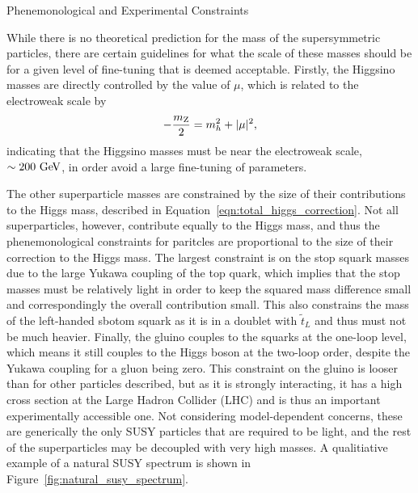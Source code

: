 \begin{section}{Phenemonological and Experimental Constraints}
\label{sec:susy_constraints}

While there is no theoretical prediction for the mass of the supersymmetric particles, there are certain guidelines for what the scale of these masses should be for a given level of fine-tuning that is deemed acceptable.
Firstly, the Higgsino masses are directly controlled by the value of $\mu$, which is related to the electroweak scale by
\begin{align}
-\frac{m_{\mathrm{Z}}}{2} = m_{h}^2 + |\mu|^2,
\end{align}
indicating that the Higgsino masses must be near the electroweak scale, $\sim 200~\mathrm{Ge\kern -0.1em V}$, in order avoid a large fine-tuning of parameters.

The other superparticle masses are constrained by the size of their contributions to the Higgs mass, described in Equation~\ref{eqn:total_higgs_correction}.
Not all superparticles, however, contribute equally to the Higgs mass, and thus the phenemonological constraints for paritcles are proportional to the size of their correction to the Higgs mass.
The largest constraint is on the stop squark masses due to the large Yukawa coupling of the top quark, which implies that the stop masses must be relatively light in order to keep the squared mass difference small and correspondingly the overall contribution small.
This also constrains the mass of the left-handed sbotom squark as it is in a doublet with $\tilde{t}_L$ and thus must not be much heavier.
Finally, the gluino couples to the squarks at the one-loop level, which means it still couples to the Higgs boson at the two-loop order, despite the Yukawa coupling for a gluon being zero.
This constraint on the gluino is looser than for other particles described, but as it is strongly interacting, it has a high cross section at the Large Hadron Collider (LHC) and is thus an important experimentally accessible one.
Not considering model-dependent concerns, these are generically the only SUSY particles that are required to be light, and the rest of the superparticles may be decoupled with very high masses.
A qualitiative example of a natural SUSY spectrum is shown in Figure~\ref{fig:natural_susy_spectrum}.


\end{section}

